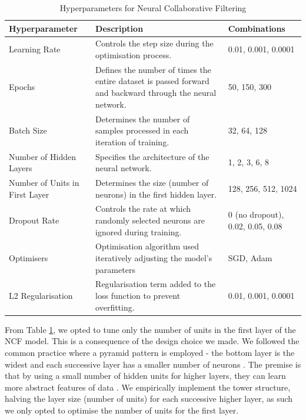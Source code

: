 \begin{table}[h]
    \centering
    \begin{tabular}{|p{6cm}|p{6cm}|p{3.5cm}|}
    \hline
    \textbf{Hyperparameter} & \textbf{Description}  & \textbf{Combinations} \\
    \hline
    Learning Rate & Controls the step size during the optimisation process. & 0.01, 0.001, 0.0001 \\
    Epochs & Defines the number of times the entire dataset is passed forward and backward through the neural network. & 50, 150, 300 \\
    Batch Size & Determines the number of samples processed in each iteration of training.  & 32, 64, 128 \\
    Number of Hidden Layers & Specifies the architecture of the neural network. & 1, 2, 3, 6, 8 \\
    Number of Units in First Layer & Determines the size (number of neurons) in the first hidden layer. & 128, 256, 512, 1024 \\
    Dropout Rate & Controls the rate at which randomly selected neurons are ignored during training. & 0 (no dropout), 0.02, 0.05, 0.08 \\
    Optimisers & Optimisation algorithm used iteratively adjusting the model's parameters & SGD, Adam \\
    L2 Regularisation & Regularisation term added to the loss function to prevent overfitting. & 0.01, 0.001, 0.0001 \\
    \hline
    \end{tabular}
    \caption{Hyperparameters for Neural Collaborative Filtering}
    \label{tab:hyperparameters}
    \end{table}

From Table \ref{tab:hyperparameters}, we opted to tune only the number of units in the first layer of the NCF model. This is a consequence of the design choice we made. We followed the common practice where a pyramid pattern is employed - the bottom layer is the widest and each successive layer has a smaller number of neurons \cite{lecun2015deep}. The premise is that by using a small number of hidden units for higher layers, they can learn more abstract features of data \cite{lee2009convolutional}. We empirically implement the tower structure, halving the layer size (number of units) for each successive higher layer, as such we only opted to optimise the number of units for the first layer.


